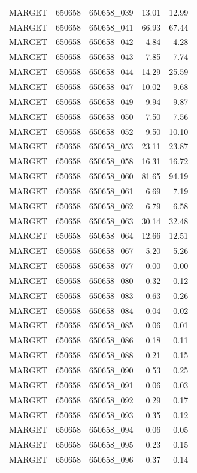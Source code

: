 \begin{tabular}{lllrr}
MARGET & 650658 & 650658_039 & 13.01 & 12.99 \\
MARGET & 650658 & 650658_041 & 66.93 & 67.44 \\
MARGET & 650658 & 650658_042 & 4.84 & 4.28 \\
MARGET & 650658 & 650658_043 & 7.85 & 7.74 \\
MARGET & 650658 & 650658_044 & 14.29 & 25.59 \\
MARGET & 650658 & 650658_047 & 10.02 & 9.68 \\
MARGET & 650658 & 650658_049 & 9.94 & 9.87 \\
MARGET & 650658 & 650658_050 & 7.50 & 7.56 \\
MARGET & 650658 & 650658_052 & 9.50 & 10.10 \\
MARGET & 650658 & 650658_053 & 23.11 & 23.87 \\
MARGET & 650658 & 650658_058 & 16.31 & 16.72 \\
MARGET & 650658 & 650658_060 & 81.65 & 94.19 \\
MARGET & 650658 & 650658_061 & 6.69 & 7.19 \\
MARGET & 650658 & 650658_062 & 6.79 & 6.58 \\
MARGET & 650658 & 650658_063 & 30.14 & 32.48 \\
MARGET & 650658 & 650658_064 & 12.66 & 12.51 \\
MARGET & 650658 & 650658_067 & 5.20 & 5.26 \\
MARGET & 650658 & 650658_077 & 0.00 & 0.00 \\
MARGET & 650658 & 650658_080 & 0.32 & 0.12 \\
MARGET & 650658 & 650658_083 & 0.63 & 0.26 \\
MARGET & 650658 & 650658_084 & 0.04 & 0.02 \\
MARGET & 650658 & 650658_085 & 0.06 & 0.01 \\
MARGET & 650658 & 650658_086 & 0.18 & 0.11 \\
MARGET & 650658 & 650658_088 & 0.21 & 0.15 \\
MARGET & 650658 & 650658_090 & 0.53 & 0.25 \\
MARGET & 650658 & 650658_091 & 0.06 & 0.03 \\
MARGET & 650658 & 650658_092 & 0.29 & 0.17 \\
MARGET & 650658 & 650658_093 & 0.35 & 0.12 \\
MARGET & 650658 & 650658_094 & 0.06 & 0.05 \\
MARGET & 650658 & 650658_095 & 0.23 & 0.15 \\
MARGET & 650658 & 650658_096 & 0.37 & 0.14 \\

\end{tabular}

